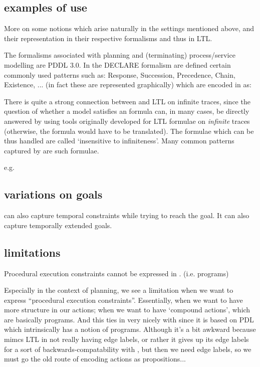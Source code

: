 \subsection{examples of use}

More on some notions which arise naturally in the settings mentioned above,
and their representation in their respective formalisms and thus in LTL.

The formalisms associated with planning and (terminating) process/service modelling are
PDDL 3.0.
In the DECLARE formalism are defined certain commonly used patterns such as:
Response, Succession, Precedence, Chain, Existence, ...
(in fact these are represented graphically)
which are encoded in \ltlf as:


There is quite a strong connection between \ltlf and LTL on infinite traces,
since the question of whether a model satisfies an \ltlf formula can,
in many cases, be directly answered by using tools originally developed for LTL formulae on
\emph{infinite} traces (otherwise, the formula would have to be translated).
The formulae which can be thus handled are called `insensitive to infiniteness'.
\cite{ldlfinsens}
Many common patterns captured by \ltlf are such formulae.

e.g.

\subsection{variations on goals}
\ltlf can also capture temporal constraints while trying to reach the goal.
It can also capture temporally extended goals.

\subsection{limitations}
Procedural execution constraints cannot be expressed in \ltlf.
\cite{ldlfsynth} (i.e. programs)

Especially in the context of planning, we see a limitation when we want to express
``procedural execution constraints''. Essentially, when we want to have more structure in our actions;
when we want to have `compound actions', which are basically programs.
And this ties in very nicely with \ldlf since it is based on PDL which intrinsically has a notion of programs.
Although it's a bit awkward because \ldlf mimcs LTL in not really having edge labels, or rather it
gives up its edge labels for a sort of backwards-compatability with \ltlf, but then we need edge labels, so
we must go the old route of encoding actions as propositions...

